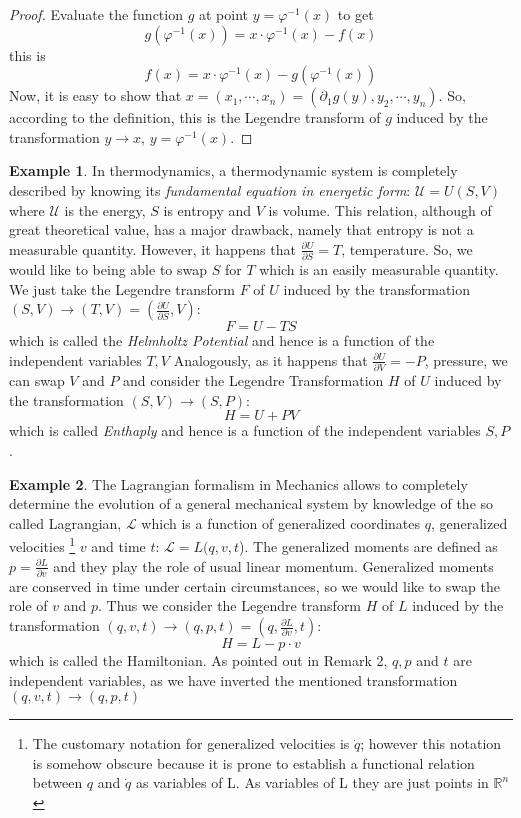 \documentclass[12pt]{article}
\theoremstyle{definition}
\newtheorem{ej}{Example}
\numberwithin{equation}{section}
\newcommand{\R}{\mathbb R}
\newcommand{\To}{\longrightarrow}
\begin{document}
\begin{proof}
Evaluate the function $g$ at point $y=\varphi^{-1}(x)$ to get
$$g(\varphi^{-1}(x))=x \cdot \varphi^{-1}(x)-f(x)$$ this is
$$f(x)=x \cdot \varphi^{-1}(x) - g(\varphi^{-1}(x))$$ Now, it is easy to show that
$x=\left(x_1,\cdots, x_n \right)=\left(\partial_1 g(y), y_2, \cdots,
y_n \right)$. So, according to the definition, this is the Legendre
transform of $g$ induced by the transformation $y \To x$,
$y=\varphi^{-1}(x)$.

\end{proof}

\begin{ej}
In thermodynamics, a thermodynamic system is completely described by
knowing its \emph{fundamental equation in energetic form}: $\mathcal
U=U(S,V)$ where $\mathcal U$ is the energy, $S$ is entropy and $V$
is volume. This relation, although of great theoretical value, has a
major drawback, namely that entropy is not a measurable quantity.
However, it happens that $\frac{\partial U}{\partial S}=T$,
temperature. So, we would like to being able to swap $S$ for $T$
which is an easily measurable quantity. We just take the Legendre
transform $F$ of $U$ induced by the transformation $(S,V) \To
(T,V)=\left(\frac{\partial U}{\partial S}, V \right)$:
$$F=U-TS$$ which is called the \emph{Helmholtz Potential} and hence
is a function of the independent variables $T,V$ Analogously, as it
happens that $\frac{\partial U}{\partial V}=-P$, pressure, we can
swap $V$ and $P$ and consider the Legendre Transformation $H$ of $U$
induced by the transformation $(S,V) \To (S,P)$: $$H=U+PV$$ which is
called \emph{Enthaply} and hence is a function of the independent
variables $S,P$.
\end{ej}

\begin{ej}
The Lagrangian formalism in Mechanics allows to completely determine
the evolution of a general mechanical system by knowledge of the so
called Lagrangian, $\mathcal L$ which is a function of generalized
coordinates $q$, generalized velocities \footnote{The customary
notation for generalized velocities is $\dot{q}$; however this
notation is somehow obscure because it is prone to establish a
functional relation between $q$ and $\dot{q}$ as variables of L. As
variables of L they are just points in $\R^n$} $v$ and time $t$:
$\mathcal L=L(q,v,t$). The generalized moments are defined as
$p=\frac{\partial L}{\partial v}$ and they play the role of usual
linear momentum. Generalized moments are conserved in time under
certain circumstances, so we would like to swap the role of $v$ and
$p$. Thus we consider the Legendre transform $H$ of $L$ induced by
the transformation $(q,v,t) \To (q,p,t)=\left(q,\frac{\partial
L}{\partial v}, t \right)$:
$$H=L-p \cdot v$$ which is called the Hamiltonian. As pointed out in Remark 2, $q, p$ and $t$ are
independent variables, as we have inverted the mentioned
transformation $(q,v,t) \To (q,p,t)$
\end{ej}
\end{document}
